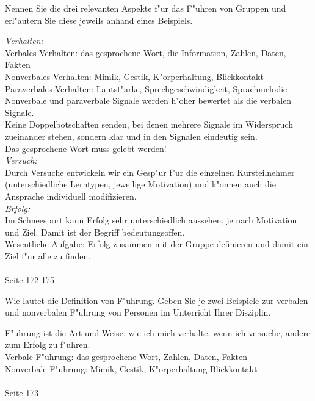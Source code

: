 \begin{question}{6}
Nennen Sie die drei relevanten Aspekte f"ur das F"uhren von Gruppen und erl"autern Sie diese jeweils anhand eines Beispiels.
\end{question}
\begin{solution}
\emph{Verhalten:}\\
Verbales Verhalten: das gesprochene Wort, die Information, Zahlen, Daten, Fakten\\
Nonverbales Verhalten: Mimik, Gestik, K"orperhaltung, Blickkontakt\\
Paraverbales Verhalten: Lautst"arke, Sprechgeschwindigkeit, Sprachmelodie\\
Nonverbale und paraverbale Signale werden h"oher bewertet als die verbalen Signale.\\
Keine Doppelbotschaften senden, bei denen mehrere Signale im Widerspruch zueinander stehen, sondern klar und in den Signalen eindeutig sein.\\
Das gesprochene Wort muss gelebt werden!\\
\emph{Versuch:}\\
Durch Versuche entwickeln wir ein Gesp"ur f"ur die einzelnen Kursteilnehmer (unterschiedliche Lerntypen, jeweilige Motivation) und k"onnen auch die Ansprache individuell modifizieren.\\
\emph{Erfolg:}\\
Im Schneesport kann Erfolg sehr unterschiedlich aussehen, je nach Motivation und Ziel. Damit ist der Begriff bedeutungsoffen.\\
Wesentliche Aufgabe: Erfolg zusammen mit der Gruppe definieren und damit ein Ziel f"ur alle zu finden.\\\\
 Seite 172-175
\end{solution}

\begin{question}{6}
Wie lautet die Definition von F"uhrung. Geben Sie je zwei Beispiele zur verbalen und nonverbalen F"uhrung von Personen im Unterricht Ihrer Disziplin.
\end{question}
\begin{solution}
F"uhrung ist die Art und Weise, wie ich mich verhalte, wenn ich versuche, andere zum Erfolg zu f"uhren.\\
Verbale F"uhrung: das gesprochene Wort, Zahlen, Daten, Fakten\\
Nonverbale F"uhrung: Mimik, Gestik, K"orperhaltung Blickkontakt\\\\
 Seite 173
\end{solution}

